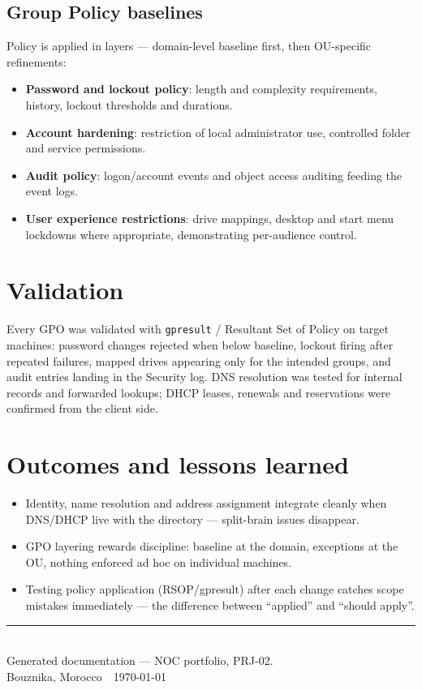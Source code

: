 \documentclass[11pt,a4paper]{article}
\begin{document}
\subsection{Group Policy baselines}
Policy is applied in layers --- domain-level baseline first, then OU-specific
refinements:
\begin{itemize}[leftmargin=1.6em]
  \item \textbf{Password and lockout policy}: length and complexity requirements,
        history, lockout thresholds and durations.
  \item \textbf{Account hardening}: restriction of local administrator use,
        controlled folder and service permissions.
  \item \textbf{Audit policy}: logon/account events and object access auditing
        feeding the event logs.
  \item \textbf{User experience restrictions}: drive mappings, desktop and start
        menu lockdowns where appropriate, demonstrating per-audience control.
\end{itemize}

\section{Validation}
Every GPO was validated with \texttt{gpresult} / Resultant Set of Policy on
target machines: password changes rejected when below baseline, lockout firing
after repeated failures, mapped drives appearing only for the intended groups,
and audit entries landing in the Security log. DNS resolution was tested for
internal records and forwarded lookups; DHCP leases, renewals and reservations
were confirmed from the client side.

\section{Outcomes and lessons learned}
\begin{itemize}[leftmargin=1.6em]
  \item Identity, name resolution and address assignment integrate cleanly when
        DNS/DHCP live with the directory --- split-brain issues disappear.
  \item GPO layering rewards discipline: baseline at the domain, exceptions at
        the OU, nothing enforced ad hoc on individual machines.
  \item Testing policy application (RSOP/gpresult) after each change catches
        scope mistakes immediately --- the difference between ``applied'' and
        ``should apply''.
\end{itemize}

\vfill
\begin{center}
  {\small\color{noc}\rule{0.5\textwidth}{0.6pt}}\\[4pt]
  {\footnotesize Generated documentation --- NOC portfolio, PRJ-02.}\\
  {\footnotesize Bouznika, Morocco \,\textbullet\, \today}
\end{center}
\end{document}

